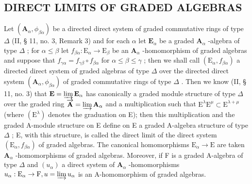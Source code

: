 \subsection{DIRECT LIMITS OF GRADED ALGEBRAS}

Let \((\mathbf{A}_{\alpha},\phi_{\beta \alpha})\) be a directed direct system of graded commutative rings of type \(\Delta\) (II, § 11, no. 3, Remark 3) and for each \(\alpha\) let \(\mathbf{E}_{\alpha}\) be a graded \(\mathbf{A}_{\alpha}\) -algebra of type \(\Delta\) ; for \(\alpha \leqslant \beta\) let \(f_{\beta \alpha}:\mathrm{E}_{\alpha}\to \mathrm{E}_{\beta}\) be an \(\mathbf{A}_{\alpha}\) -homomorphism of graded algebras and suppose that \(f_{\gamma \alpha} = f_{\gamma \beta}\circ f_{\beta \alpha}\) for \(\alpha \leqslant \beta \leqslant \gamma\) ; then we shall call \((\mathrm{E}_{\alpha},f_{\beta \alpha})\) a directed direct system of graded algebras of type \(\Delta\) over the directed direct system \((\mathbf{A}_{\alpha},\phi_{\beta \alpha})\) of graded commutative rings of type \(\Delta\) . Then we know (II, § 11, no. 3) that \(\mathbf{E} = \varinjlim \mathbf{E}_{\alpha}\) has canonically a graded module structure of type \(\Delta\) over the graded ring \(\overrightarrow{\mathbf{A}} = \varinjlim \mathbf{A}_{\alpha}\) and a multiplication such that \(\mathrm{E}^{\lambda}\mathrm{E}^{\mu}\subset \mathrm{E}^{\lambda +\mu}\) (where \((\mathrm{E}^{\lambda})\) denotes the graduation on E); then this multiplication and the graded A-module structure on E define on E a graded A-algebra structure of type \(\Delta\) ; E, with this structure, is called the direct limit of the direct system \((\mathrm{E}_{\alpha},f_{\beta \alpha})\) of graded algebras. The canonical homomorphisms \(\mathrm{E}_{\alpha}\rightarrow \mathrm{E}\) are taken \(\mathbf{A}_{\alpha}\) -homomorphisms of graded algebras. Moreover, if F is a graded A-algebra of type \(\Delta\) and \((u_{\alpha})\) a direct system of \(\mathbf{A}_{\alpha}\) -homomorphisms \(u_{\alpha}:\mathrm{E}_{\alpha}\rightarrow \mathrm{F}, u = \varinjlim u_{\alpha}\) is an A-homomorphism of graded algebras.

